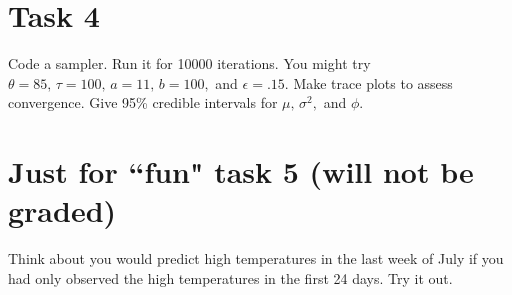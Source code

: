 \documentclass{article}
\begin{document}
\section*{Task 4}

Code a sampler. Run it for 10000 iterations. You might try $\theta=85, \, \tau=100, \, a=11, \, b=100,$ and $\epsilon=.15.$ Make trace plots to assess convergence. Give 95\% credible intervals for $\mu, \, \sigma^2,$ and $\phi.$ 

\section*{Just for ``fun" task 5 (will not be graded)}

Think about you would predict high temperatures in the last week of July if you had only observed the high temperatures in the first 24 days. Try it out. 
\end{document}
